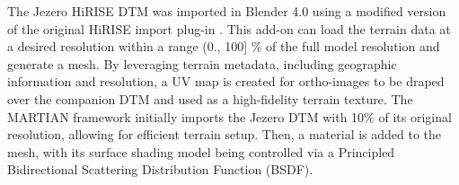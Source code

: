 The Jezero HiRISE DTM was imported in Blender 4.0 using a modified version of the original HiRISE import plug-in \cite{BlenderHiRISEDTMImporter}. This add-on can load the terrain data at a desired resolution within a range (0., 100] $\%$ of the full model resolution and generate a mesh. By leveraging terrain metadata, including geographic information and resolution, a UV map is created for ortho-images to be draped over the companion DTM and used as a high-fidelity terrain texture. 
The MARTIAN framework initially imports the Jezero DTM with 10$\%$ of its original resolution, allowing for efficient terrain setup. Then, a material is added to the mesh, with its surface shading model being controlled via a Principled Bidirectional Scattering Distribution Function (BSDF).
